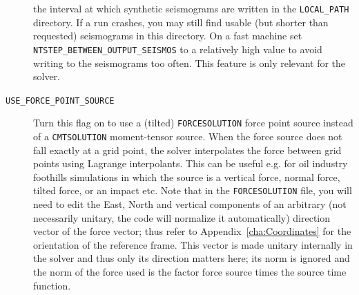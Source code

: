\begin{description}
the interval at which synthetic seismograms are written in the \texttt{LOCAL\_PATH}
directory. If a run crashes, you may still find usable (but shorter
than requested) seismograms in this directory. On a fast machine set
\texttt{NTSTEP\_BETWEEN\_OUTPUT\_SEISMOS} to a relatively high value
to avoid writing to the seismograms too often. This feature is only
relevant for the solver.
\item [{\texttt{USE\_FORCE\_POINT\_SOURCE}}] Turn this flag on to use a
(tilted) \texttt{FORCESOLUTION} force point source instead of a \texttt{CMTSOLUTION}
moment-tensor source. When the force source does not fall exactly
at a grid point, the solver interpolates the force between grid points
using Lagrange interpolants. This can be useful e.g. for oil industry
foothills simulations in which the source is a vertical force, normal
force, tilted force, or an impact etc. Note that in the \texttt{FORCESOLUTION}
file, you will need to edit the East, North and vertical components
of an arbitrary (not necessarily unitary, the code will normalize it automatically) direction vector of the force vector;
thus refer to Appendix~\ref{cha:Coordinates} for the orientation
of the reference frame. This vector is made unitary internally in
the solver and thus only its direction matters here; its norm is ignored
and the norm of the force used is the factor force source times the
source time function.


\end{description}
